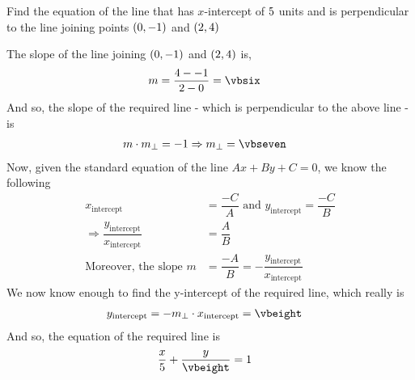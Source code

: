 \question[4] Find the equation of the line that has $x$-intercept of $5$ units and is perpendicular
to the line joining points $(0, -1)$ and $(2, 4)$


\watchout

\ifprintanswers
\fi 

\begin{solution}[\halfpage]
	The slope of the line joining $(0, -1)$ and $(2, 4)$ is,
	\begin{align}
		m &= \dfrac{\vbfour-\vbtwo}{\vbthree-\vbone} = \vbsix
	\end{align}
	And so, the slope of the required line - which is perpendicular to the above line - is 
	\begin{align}
		m\cdot m_{\perp} &= -1 \Rightarrow m_{\perp} = \vbseven
	\end{align}
	Now, given the standard equation of the line $Ax + By + C = 0$, we know the following
	\begin{align}
		x_{\text{intercept}} &= \dfrac{-C}{A} \text{ and } y_{\text{intercept}} = \dfrac{-C}{B} \\
		\Rightarrow \dfrac{y_{\text{intercept}}}{x_{\text{intercept}}} &= \dfrac{A}{B} \\
		\text{Moreover, the slope } m &= \dfrac{-A}{B} = -\dfrac{y_{\text{intercept}}}{x_{\text{intercept}}}
	\end{align}
    We now know enough to find the y-intercept of the required line, which really is
    \begin{align}
    	y_{\text{intercept}} &= -m_{\perp}\cdot x_{\text{intercept}} = \vbeight
    \end{align}
    And so, the equation of the required line is 
    \begin{align}
    	\dfrac{x}{\vbfive} + \dfrac{y}{\vbeight} &= 1
    \end{align}
\end{solution}
